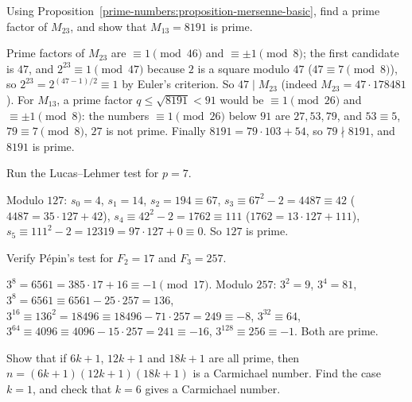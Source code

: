\begin{exercise}\label{prime-numbers:exercise-mersenne-factors}
Using Proposition~\ref{prime-numbers:proposition-mersenne-basic}, find a prime factor of $M_{23}$, and show that $M_{13} = 8191$ is prime.
\end{exercise}

\begin{solution}
Prime factors of $M_{23}$ are $\equiv 1 \pmod{46}$ and $\equiv \pm 1 \pmod 8$; the first candidate is $47$, and $2^{23} \equiv 1 \pmod{47}$ because $2$ is a square modulo $47$ ($47 \equiv 7 \pmod 8$), so
$2^{23} = 2^{(47-1)/2} \equiv 1$ by Euler's criterion. So $47 \mid M_{23}$ (indeed $M_{23} = 47 \cdot 178481$). For $M_{13}$, a prime factor $q \leq \sqrt{8191} < 91$ would be $\equiv 1 \pmod{26}$
and $\equiv \pm 1 \pmod 8$: the numbers $\equiv 1 \pmod{26}$ below $91$ are $27, 53, 79$, and $53 \equiv 5$, $79 \equiv 7 \pmod 8$, $27$ is not prime. Finally $8191 = 79 \cdot 103 + 54$, so $79 \nmid 8191$,
and $8191$ is prime.
\end{solution}

\begin{exercise}\label{prime-numbers:exercise-lucas-lehmer-seven}
Run the Lucas--Lehmer test for $p = 7$.
\end{exercise}

\begin{solution}
Modulo $127$: $s_0 = 4$, $s_1 = 14$, $s_2 = 194 \equiv 67$, $s_3 \equiv 67^2 - 2 = 4487 \equiv 42$ ($4487 = 35 \cdot 127 + 42$), $s_4 \equiv 42^2 - 2 = 1762 \equiv 111$ ($1762 = 13 \cdot 127 + 111$),
$s_5 \equiv 111^2 - 2 = 12319 = 97 \cdot 127 + 0 \equiv 0$. So $127$ is prime.
\end{solution}

\begin{exercise}\label{prime-numbers:exercise-pepin}
Verify P\'epin's test for $F_2 = 17$ and $F_3 = 257$.
\end{exercise}

\begin{solution}
$3^8 = 6561 = 385 \cdot 17 + 16 \equiv -1 \pmod{17}$. Modulo $257$: $3^2 = 9$, $3^4 = 81$, $3^8 = 6561 \equiv 6561 - 25 \cdot 257 = 136$, $3^{16} \equiv 136^2 = 18496 \equiv 18496 - 71 \cdot 257 = 249 \equiv -8$,
$3^{32} \equiv 64$, $3^{64} \equiv 4096 \equiv 4096 - 15 \cdot 257 = 241 \equiv -16$, $3^{128} \equiv 256 \equiv -1$. Both are prime.
\end{solution}

\begin{exercise}\label{prime-numbers:exercise-chernick}
Show that if $6k + 1$, $12k + 1$ and $18k + 1$ are all prime, then $n = (6k + 1)(12k + 1)(18k + 1)$ is a Carmichael number. Find the case $k = 1$, and check that $k = 6$ gives a Carmichael number.
\end{exercise}

